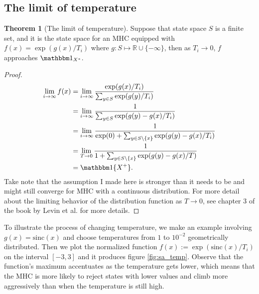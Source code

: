 \documentclass[]{article}
\theoremstyle{definition}
\newtheorem{theorem}{Theorem}       %
\begin{document}
    \subsection{The limit of temperature}
        \begin{theorem}[The limit of temperature]
            Suppose that state space $S$ is a finite set, and it is the state space for an MHC equipped with $f(x) = \exp(g(x)/T_i)$ where $g:S \mapsto \mathbb R \cup \{-\infty\}$, then as $T_i\rightarrow 0$, $f$ approaches $\mathbbm 1_{X^*}$. 
        \end{theorem}
        \begin{proof}
            \begin{align*}
                \lim_{i\rightarrow \infty}f(x) 
                &= 
                \lim_{i\rightarrow \infty} \frac{\exp(g(x)/T_i)}
                {
                    \sum_{y\in S}^{}
                    \exp(g(y)/T_i)
                }
                \\
                &= 
                \lim_{i\rightarrow \infty}
                \frac{1}{\sum_{y\in S}^{}\exp(g(y) - g(x)/T_i)}
                \\
                &= 
                \lim_{i\rightarrow \infty}
                \frac{1}{\exp(0) + \sum_{y\in S\setminus\{x\}}^{}\exp(g(y) - g(x)/T_i)}
                \\
                &= 
                \lim_{T\rightarrow 0}
                \frac{1}{1 + \sum_{y\in S\setminus\{x\}}^{}\exp(g(y) - g(x)/T)}
                \\
                &= \mathbbm 1\{X^+\}. 
            \end{align*}
            Take note that the assumption I made here is stronger than it needs to be and might still converge for MHC with a continuous distribution. For more detail about the limiting behavior of the distribution function as $T\rightarrow 0$, see chapter 3 of the book by Levin et al. \cite {book:mkv_mix_time} for more details. 
        \end{proof}
        To illustrate the process of changing temperature, we make an example involving $g(x) = \text{sinc}(x)$ and choose temperatures from $1$ to $10^{-2}$ geometrically distributed. Then we plot the normalized function $f(x):= \exp(\text{sinc}(x)/T_i)$ on the interval $[-3, 3]$ and it produces figure \ref*{fig:sa_temp}. Observe that the function's maximum accentuates as the temperature gets lower, which means that the MHC is more likely to reject states with lower values and climb more aggressively than when the temperature is still high. 
\end{document}
